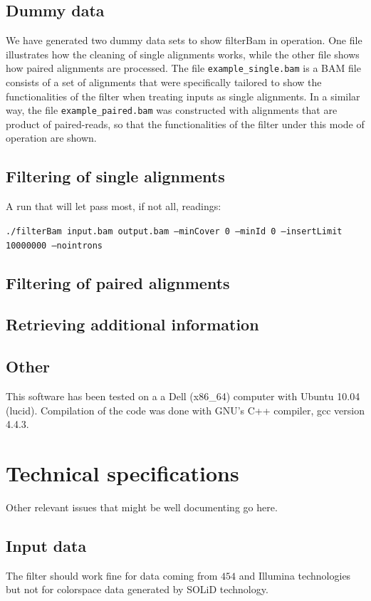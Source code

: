 \documentclass[11pt]{article}
\newcommand{\unix}[1]{\texttt{#1}}
\begin{document}
{\subsection{Dummy data}
We have generated two dummy data sets to show filterBam in operation. One file illustrates how the cleaning of
single alignments works, while the other file shows how paired alignments are processed. The file 
\unix{example\_single.bam} is a BAM file consists of a set of alignments that were specifically tailored to show 
the functionalities of the filter when treating inputs as single alignments. In a similar way, the file 
\unix{example\_paired.bam} was constructed with alignments that are product of paired-reads, so that the 
functionalities of the filter under this mode of operation are shown.

\subsection{Filtering of single alignments}
A run that will let pass most, if not all, readings: 
\begin{flushleft}
\unix{./filterBam input.bam output.bam --minCover 0 --minId 0  --insertLimit 10000000 --nointrons}
\end{flushleft}

\subsection{Filtering of paired alignments}

\subsection{Retrieving additional information}

\subsection{Other}
This software has been tested on a a Dell (x86\_64) computer with Ubuntu 10.04 (lucid). Compilation of the 
code was done with GNU's C++ compiler, gcc version 4.4.3. 

\section{Technical specifications}

Other relevant issues that might be well documenting go here.

\subsection{Input data}
The filter should work fine for data coming from $454$ and Illumina technologies but not for colorspace data generated by SOLiD technology. 

}
\end{document}
